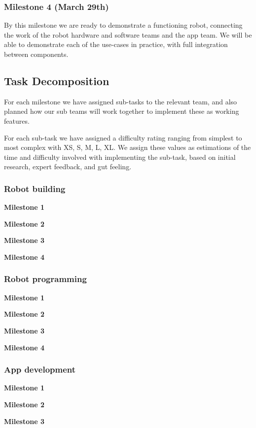 \documentclass{article}
\begin{document}
\subsubsection{Milestone 4 (March 29th)}
By this milestone we are ready to demonstrate a functioning robot, connecting the work of the robot hardware and software teams and the app team. We will be able to demonstrate each of the use-cases in practice, with full integration between components. 

\subsection{Task Decomposition}

For each milestone we have assigned sub-tasks to the relevant team, and also planned how our sub teams will work together to implement these as working features.

For each sub-task we have assigned a difficulty rating ranging from simplest to most complex with XS, S, M, L, XL. We assign these values as estimations of the time and difficulty involved with implementing the sub-task, based on initial research, expert feedback, and gut feeling. 


\subsubsection{Robot building}

{\bf Milestone 1}

{\bf Milestone 2}

{\bf Milestone 3}

{\bf Milestone 4}


\subsubsection{Robot programming}

{\bf Milestone 1}

{\bf Milestone 2}

{\bf Milestone 3}

{\bf Milestone 4}

\subsubsection{App development}

{\bf Milestone 1}

{\bf Milestone 2}

{\bf Milestone 3}
\end{document}
